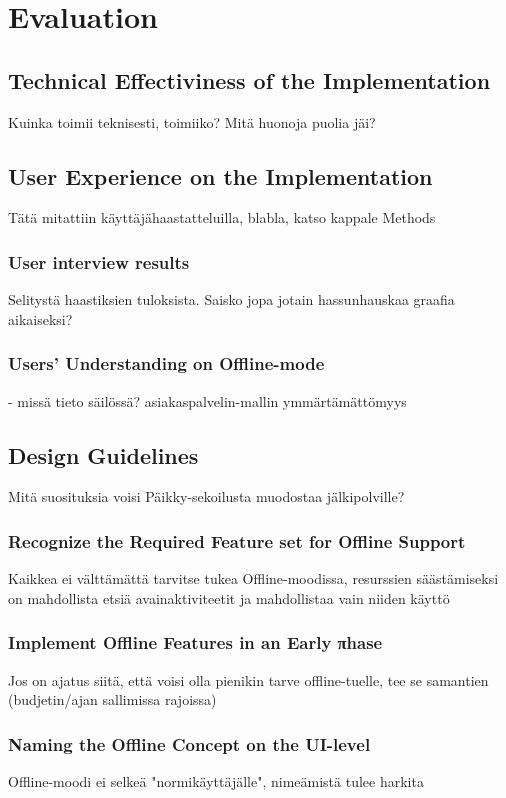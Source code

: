 
\chapter{Evaluation}

\section{Technical Effectiviness of the Implementation}
Kuinka toimii teknisesti, toimiiko? Mitä huonoja puolia jäi?



\section{User Experience on the Implementation}
Tätä mitattiin käyttäjähaastatteluilla, blabla, katso kappale Methods

\subsection{User interview results}
Selitystä haastiksien tuloksista. Saisko jopa jotain hassunhauskaa graafia aikaiseksi?



\subsection{Users' Understanding on Offline-mode}
- missä tieto säilössä? asiakaspalvelin-mallin ymmärtämättömyys




\section{Design Guidelines}
Mitä suosituksia voisi Päikky-sekoilusta muodostaa jälkipolville?

\subsection{Recognize the Required Feature set for Offline Support}
Kaikkea ei välttämättä tarvitse tukea Offline-moodissa, resurssien säästämiseksi on mahdollista etsiä avainaktiviteetit ja mahdollistaa vain niiden käyttö


\subsection{Implement Offline Features in an Early πhase}
Jos on ajatus siitä, että voisi olla pienikin tarve offline-tuelle, tee se samantien (budjetin/ajan sallimissa rajoissa)

\subsection{Naming the Offline Concept on the UI-level}
Offline-moodi ei selkeä "normikäyttäjälle", nimeämistä tulee harkita
